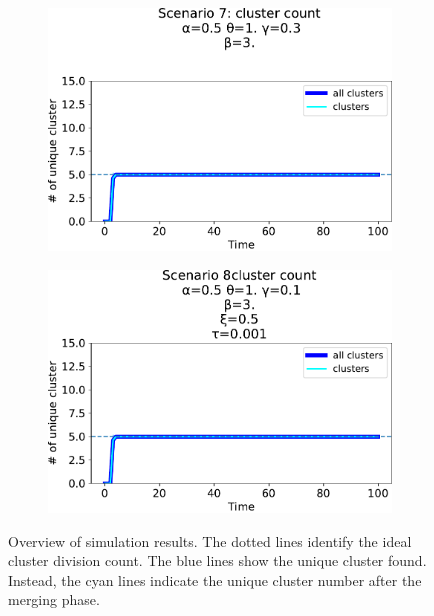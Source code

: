 \begin{figure}[t]
\begin{subfigure}[b]{0.32\textwidth}
    \includegraphics[width=\textwidth]{papers/swarm-intelligence2021/img/simulations/standard-updatable_0_021_α-0.5_θ-1._γ-0.3_β-3._ω-0._ζ-0..pdf}
  \end{subfigure}
  \begin{subfigure}[b]{0.32\textwidth}
    \centering
    \includegraphics[width=\textwidth]{papers/swarm-intelligence2021/img/simulations/failScenario_0_021_α-0.5_θ-1._γ-0.1_β-3._ω-0._ζ-0._ξ-0.5_τ-0.001}
  \end{subfigure}
  \caption[Overview of simulation results in different clustering scenarios]{Overview of simulation results. 
  The dotted lines identify the ideal cluster division count. 
  The blue lines show the unique cluster found. 
  Instead, the cyan lines indicate the unique cluster number after the merging phase. 
  }
  \label{fig:overview-results}
\end{figure}